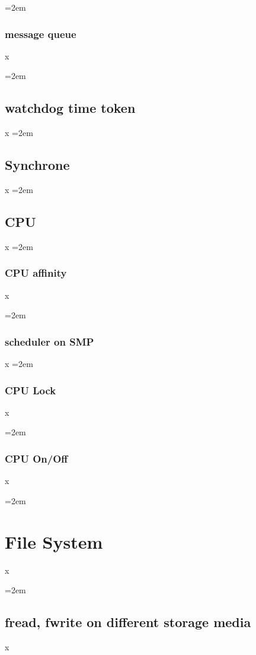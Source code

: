 \documentclass[a4paper]{article}
\let\oldsection\section
\renewcommand{\section}{\leftskip=2em \oldsection}
\let\oldsubsection\subsection
\renewcommand{\subsection}{\leftskip=2em \oldsubsection}
\let\oldsubsubsection\subsubsection
\renewcommand{\subsubsection}{\leftskip=2em \oldsubsubsection}
\begin{document}
\subsubsection{message queue}
x


\subsection{watchdog time token}

x
\subsection{Synchrone}

x
\subsection{ CPU}

x
\subsubsection{ CPU affinity}
x

\subsubsection{ scheduler on SMP}

x
\subsubsection{ CPU Lock}
x

\subsubsection{ CPU On/Off}
x



\newpage
\section{File System}

x

\subsection{fread, fwrite on different storage media}
x


\newpage
\end{document}
